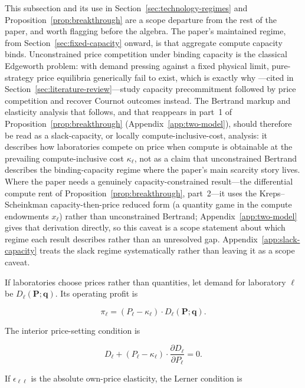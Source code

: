 \documentclass[11pt]{article}
\begin{document}
This subsection and its use in Section~\ref{sec:technology-regimes} and Proposition~\ref{prop:breakthrough} are a scope departure from the rest of the paper, and worth flagging before the algebra. The paper's maintained regime, from Section~\ref{sec:fixed-capacity} onward, is that aggregate compute capacity binds. Unconstrained price competition under binding capacity is the classical Edgeworth problem: with demand pressing against a fixed physical limit, pure-strategy price equilibria generically fail to exist, which is exactly why \citet{krepsScheinkman1983}---cited in Section~\ref{sec:literature-review}---study capacity precommitment followed by price competition and recover Cournot outcomes instead. The Bertrand markup and elasticity analysis that follows, and that reappears in part~1 of Proposition~\ref{prop:breakthrough} (Appendix~\ref{app:two-model}), should therefore be read as a slack-capacity, or locally compute-inclusive-cost, analysis: it describes how laboratories compete on price when compute is obtainable at the prevailing compute-inclusive cost $\kappa_\ell$, not as a claim that unconstrained Bertrand describes the binding-capacity regime where the paper's main scarcity story lives. Where the paper needs a genuinely capacity-constrained result---the differential compute rent of Proposition~\ref{prop:breakthrough}, part~2---it uses the Kreps--Scheinkman capacity-then-price reduced form (a quantity game in the compute endowments $x_\ell$) rather than unconstrained Bertrand; Appendix~\ref{app:two-model} gives that derivation directly, so this caveat is a scope statement about which regime each result describes rather than an unresolved gap. Appendix~\ref{app:slack-capacity} treats the slack regime systematically rather than leaving it as a scope caveat.

If laboratories choose prices rather than quantities, let demand for laboratory $\ell$ be $D_\ell(\mathbf P;\mathbf q)$. Its operating profit is

\begin{equation}\pi_\ell=\left(P_\ell-\kappa_\ell\right)\cdot D_\ell(\mathbf P;\mathbf q).\end{equation}

The interior price-setting condition is

\begin{equation}D_\ell+\left(P_\ell-\kappa_\ell\right)\cdot\frac{\partial D_\ell}{\partial P_\ell}=0.\end{equation}

If $\epsilon_{\ell\ell}$ is the absolute own-price elasticity, the Lerner condition is
\end{document}
